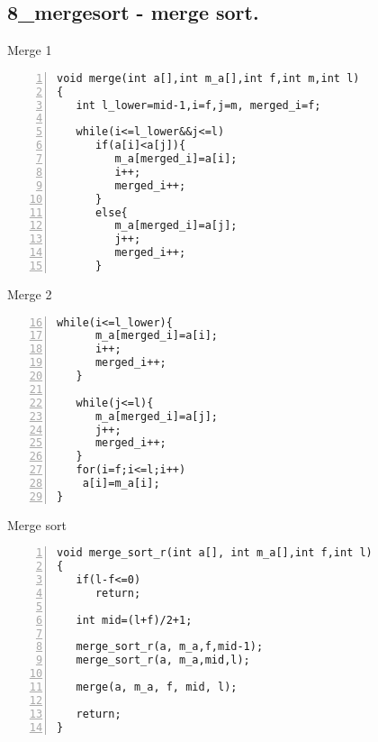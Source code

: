 \documentclass{beamer}
\begin{document}
\subsection*{8\_mergesort - merge sort.}
\begin{frame}[fragile]{Merge 1}
\begin{lstlisting}[numbers=left]
void merge(int a[],int m_a[],int f,int m,int l)
{
   int l_lower=mid-1,i=f,j=m, merged_i=f;

   while(i<=l_lower&&j<=l)
      if(a[i]<a[j]){
         m_a[merged_i]=a[i];
         i++;
         merged_i++;
      }
      else{
         m_a[merged_i]=a[j];
         j++;
         merged_i++;
      }
\end{lstlisting}
\end{frame}
\begin{frame}[fragile]{Merge 2}
\begin{lstlisting}[numbers=left,firstnumber=16]
   while(i<=l_lower){
      m_a[merged_i]=a[i];
      i++;
      merged_i++;
   }

   while(j<=l){
      m_a[merged_i]=a[j];
      j++;
      merged_i++;
   }
   for(i=f;i<=l;i++)
    a[i]=m_a[i];
}
\end{lstlisting}
\end{frame}

\begin{frame}[fragile]{Merge sort}
\begin{lstlisting}[numbers=left]
void merge_sort_r(int a[], int m_a[],int f,int l)
{
   if(l-f<=0)
      return;

   int mid=(l+f)/2+1;

   merge_sort_r(a, m_a,f,mid-1);
   merge_sort_r(a, m_a,mid,l);

   merge(a, m_a, f, mid, l);

   return;
}
\end{lstlisting}
\end{frame}
\end{document}
